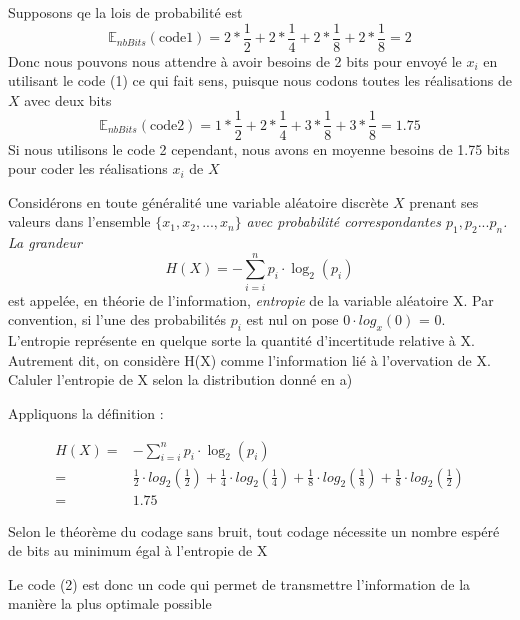 \begin{exo}
\begin{subexo}{Supposons qe la lois de probabilité est}
    \[
      \mathbb{E}_{nbBits}(\text{code1}) = 2 * \frac{1}{2} + 2 * \frac{1}{4} +
      2*\frac{1}{8} + 2*\frac{1}{8} = 2
    \]
    Donc nous pouvons nous attendre à avoir besoins de 2 bits pour envoyé le $x_i$
     en utilisant le code  (1) ce qui fait sens, puisque nous codons toutes les réalisations
     de $X$ avec deux bits
    \[
      \mathbb{E}_{nbBits}(\text{code2}) = 1 * \frac{1}{2} + 2 * \frac{1}{4} +
      3*\frac{1}{8} + 3*\frac{1}{8} = 1.75
    \]
    Si nous utilisons le code 2 cependant, nous avons en moyenne besoins de 1.75 bits pour 
    coder les réalisations $x_i$ de $X$
  \end{subexo}
  \begin{subexo}{Considérons en toute généralité une variable aléatoire discrète $X$
     prenant ses valeurs dans l'ensemble $\{x_1,x_2,... , x_n\}$ 
     \textit{avec probabilité correspondantes $p_1, p_2... p_n$. La grandeur 
     \[
      H(X) = - \sum_{i=i}^{n}p_i \cdot \log_2(p_i) 
     \]}
      est appelée, en théorie de l'information, \textit{entropie} 
      de la variable aléatoire X. Par convention, si l'une des probabilités $p_i$ est nul
      on pose $0 \cdot log_x(0)$ = 0. L'entropie représente en quelque sorte la quantité d'incertitude relative à X.
       Autrement dit, on considère H(X) comme l'information lié à l'overvation de X.
       Caluler l'entropie de X selon la distribution donné en a)}

       Appliquons la définition : 
       
       \setcounter{equation}{0}
       \begin{align}
         H(X) =& -\sum_{i=i}^{n}p_i \cdot \log_2(p_i) \\
          =&  \frac{1}{2}\cdot log_2(\frac{1}{2}) + \frac{1}{4}\cdot log_2(\frac{1}{4})
          + \frac{1}{8}\cdot log_2(\frac{1}{8})
          + \frac{1}{8}\cdot log_2(\frac{1}{2})\\
          =& 1.75
        \end{align}
  \end{subexo}
  \begin{subexo}{Selon le théorème du codage sans bruit, tout codage nécessite 
    un nombre espéré de bits au minimum égal à l'entropie de X}
    
    Le code (2) est donc un code qui permet de transmettre l'information de la manière la plus optimale possible

  \end{subexo}
\end{exo}

